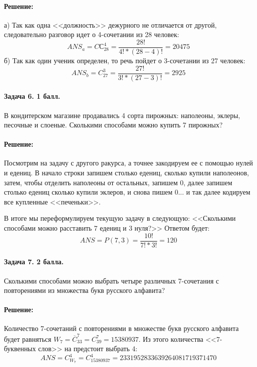 \documentclass[12pt]{article}
\begin{document}
\paragraph{\bf Решение:}
а) Так как одна <<должность>> дежурного не отличается от другой, следовательно
разговор идет о 4-сочетании из 28 человек:
$$ ANS_a = CС_{28}^{4} = \frac{28!}{4! * (28 - 4)!} = 20475 $$
б) Так как один ученик определен, то речь пойдет о 3-сочетании из 27 человек:
$$ ANS_b = C_{27}^{3} = \frac{27!}{3! * (27 - 3)!} = 2925 $$

\paragraph{Задача 6. 1 балл.} В кондитерском магазине продавались 4 сорта 
пирожных: наполеоны, эклеры, песочные и слоеные. Сколькими способами 
можно купить 7 пирожных? 

\paragraph{\bf Решение:}
Посмотрим на задачу с другого ракурса, а точнее закодируем ее с помощью
нулей и едениц. В начало строки запишем столько едениц, сколько купили наполеонов, затем,
чтобы отделить наполеоны от остальных, запишем 0, далее запишем столько едениц
сколько купили эклеров, и снова пишем 0... и так далее кодируем все купленные <<печеньки>>.

В итоге мы переформулируем текущую задачу в следующую: <<Сколькими способами можно
расставить 7 едениц и 3 нуля?>> Ответом будет:
$$ ANS = P(7, 3) = \frac{10!}{7! * 3!} = 120 $$

\paragraph{Задача 7. 2 балла.} Сколькими способами можно выбрать четыре 
различных 7-со\-че\-та\-ния с повторениями из множества букв русского 
алфавита?

\paragraph{\bf Решение:}
Количество 7-сочетаний с повторениями в множестве букв русского алфавита
будет равняться $ W_7 = \overline{C}_{33}^{7} = C_{39}^{7} = 15380937 $. Из этого
количества <<7-буквенных слов>> на предстоит выбрать 4:
$$ ANS = C_{W_7}^{4} = C_{15380937}^{4} = 2331952833639264081719371470 $$
\end{document}
